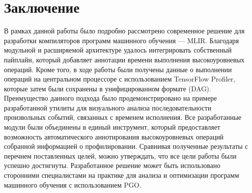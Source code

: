 \section{Заключение}
\label{sec:Chapter4} 

В рамках данной работы было подробно рассмотрено современное решение для разработки компиляторов программ машинного обучения — MLIR.
Благодаря модульной и расширяемой архитектуре удалось интегрировать собственный пайплайн, который добавляет аннотации времени выполнения высокоуровневых операций.
Кроме того, в ходе работы были получены данные о выполнении операций на центральном процессоре с использованием TensorFlow Profiler, которые затем были сохранены в унифицированном формате (DAG).
Преимущество данного подхода было продемонстрировано на примере разработанной утилиты для визуального анализа последовательности произвольных событий, связанных с временем исполнения.
Все разработанные модули были объединены в единый инструмент, который предоставляет возможность автоматического аннотирования высокоуровневых операций собранной информацией о профилировании.
Сравнивая полученные результаты с перечнем поставленных целей, можно утверждать, что все цели работы были успешно достигнуты. Разработанное решение может быть использовано сторонними специалистами на практике для анализа и оптимизации программ машинного обучения с использованием PGO.

\newpage

